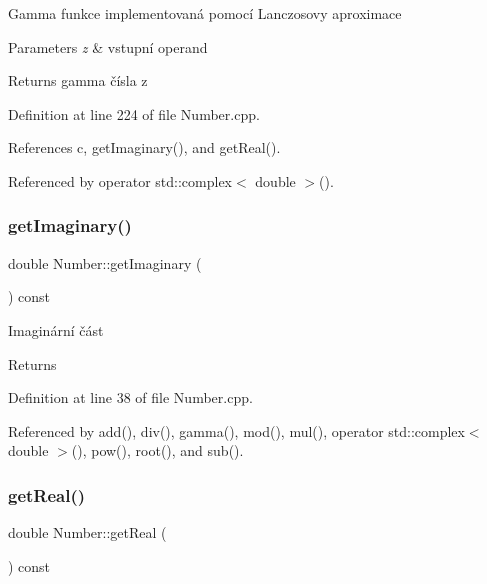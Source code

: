 Gamma funkce implementovaná pomocí Lanczosovy aproximace


\begin{DoxyParams}{Parameters}
{\em z} & vstupní operand \\
\hline
\end{DoxyParams}
\begin{DoxyReturn}{Returns}
gamma čísla z 
\end{DoxyReturn}


Definition at line 224 of file Number.\+cpp.



References c, get\+Imaginary(), and get\+Real().



Referenced by operator std\+::complex$<$ double $>$().

\mbox{\label{classteam22_1_1_math_1_1_number_a033e1df614efe28459cabef254ca0a25}} 
\subsubsection{\texorpdfstring{get\+Imaginary()}{getImaginary()}}
{\footnotesize\ttfamily double Number\+::get\+Imaginary (\begin{DoxyParamCaption}{ }\end{DoxyParamCaption}) const}

Imaginární část \begin{DoxyReturn}{Returns}

\end{DoxyReturn}


Definition at line 38 of file Number.\+cpp.



Referenced by add(), div(), gamma(), mod(), mul(), operator std\+::complex$<$ double $>$(), pow(), root(), and sub().

\mbox{\label{classteam22_1_1_math_1_1_number_adacbe355e9278da6a218598706c7f77c}} 
\subsubsection{\texorpdfstring{get\+Real()}{getReal()}}
{\footnotesize\ttfamily double Number\+::get\+Real (\begin{DoxyParamCaption}{ }\end{DoxyParamCaption}) const}

